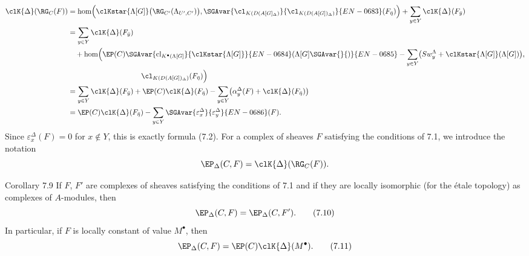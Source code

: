 \[
\begin{aligned}
\clK{\Delta}(\RG_C(F))
&=\operatorname{hom}\Bigl(
\clKstar{\Lambda[G]}\bigl(\RG_{C'}(\Lambda_{U',C'})\bigr),
\SGAvar{\cl_{K(D(A[G]_\Delta)}}{\cl_{K(D(A[G])_\Delta)}}{EN-0683}(F_{\bar\eta})\Bigr)
 +\sum_{y\in Y}\clK{\Delta}(F_{\bar y})\\
&=\sum_{y\in Y}\clK{\Delta}(F_{\bar y})\\
&\quad +\operatorname{hom}\Bigl(
\EP(C)\SGAvar{\operatorname{cl}_{K^{\bullet}(\Lambda[G]}}{\clKstar{\Lambda[G]}}{EN-0684}(\Lambda[G]\SGAvar{}{)}{EN-0685}
 -\sum_{y\in Y}\bigl(Sw_y^{\Lambda}+\clKstar{\Lambda[G]}(\Lambda[G])\bigr),\\
&\hspace{10em}\cl_{K(D(A[G])_\Delta)}(F_{\bar\eta})\Bigr)\\
&=\sum_{y\in Y}\clK{\Delta}(F_{\bar y})
 +\EP(C)\clK{\Delta}(F_{\bar\eta})
 -\sum_{y\in Y}\bigl(\alpha_y^\Delta(F)+\clK{\Delta}(F_{\bar\eta})\bigr)\\
&=\EP(C)\clK{\Delta}(F_{\bar\eta})
 -\sum_{y\in Y}\SGAvar{\varepsilon_x^\Delta}{\varepsilon_y^\Delta}{EN-0686}(F).
\end{aligned}
\]
Since $\varepsilon_x^\Delta(F)=0$ for $x\notin Y$, this is exactly formula (7.2). For a complex of sheaves $F$ satisfying the conditions of 7.1, we introduce the notation
\[
\EP_\Delta(C,F)=\clK{\Delta}(\RG_C(F)).
\]

\begin{statement}{Corollary 7.9}
If $F$, $F'$ are complexes of sheaves satisfying the conditions of 7.1 and if they are locally isomorphic (for the étale topology) as complexes of $A$-modules, then
\[
\EP_\Delta(C,F)=\EP_\Delta(C,F').
\tag{7.10}
\]
In particular, if $F$ is locally constant of value $M^\bullet$, then
\[
\EP_\Delta(C,F)=\EP(C)\clK{\Delta}(M^\bullet).
\tag{7.11}
\]
\end{statement}

